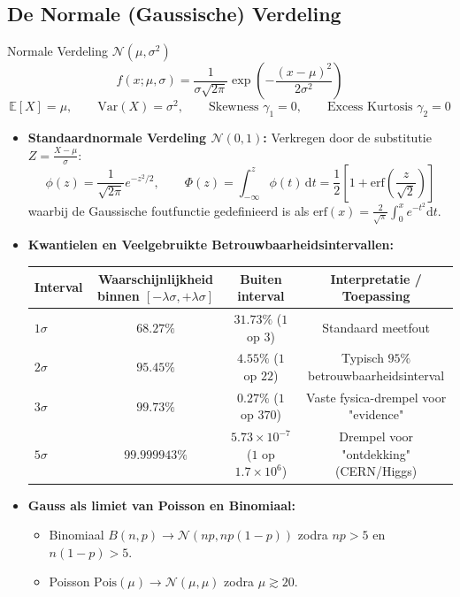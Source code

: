 \documentclass[11pt,a4paper]{article}
\newcommand{\E}{\mathbb{E}}
\newcommand{\Var}{\text{Var}}
\newcommand{\dd}{\mathrm{d}}
\newcommand{\normdist}{\mathcal{N}}
\begin{document}
\subsection{De Normale (Gaussische) Verdeling}
\begin{defbox}{Normale Verdeling $\normdist(\mu, \sigma^2)$}
\begin{equation}
    f(x; \mu, \sigma) = \frac{1}{\sigma \sqrt{2\pi}} \exp\left( -\frac{(x - \mu)^2}{2\sigma^2} \right)
\end{equation}
\begin{equation}
    \E[X] = \mu, \qquad \Var(X) = \sigma^2, \qquad \text{Skewness } \gamma_1 = 0, \qquad \text{Excess Kurtosis } \gamma_2 = 0
\end{equation}
\end{defbox}

\begin{itemize}[leftmargin=1.5em]
    \item \textbf{Standaardnormale Verdeling $\normdist(0, 1)$:}
    Verkregen door de substitutie $Z = \frac{X - \mu}{\sigma}$:
    \begin{equation}
        \phi(z) = \frac{1}{\sqrt{2\pi}} e^{-z^2/2}, \qquad \Phi(z) = \int_{-\infty}^z \phi(t) \, \dd t = \frac{1}{2} \left[ 1 + \text{erf}\left( \frac{z}{\sqrt{2}} \right) \right]
    \end{equation}
    waarbij de Gaussische foutfunctie gedefinieerd is als $\text{erf}(x) = \frac{2}{\sqrt{\pi}}\int_0^x e^{-t^2}\dd t$.
    \item \textbf{Kwantielen en Veelgebruikte Betrouwbaarheidsintervallen:}
    \begin{center}
        \small
        \begin{tabular}{lccc}
            \toprule
            Interval & Waarschijnlijkheid binnen $[-\lambda\sigma, +\lambda\sigma]$ & Buiten interval & Interpretatie / Toepassing \\
            \midrule
            $1\sigma$ & $68.27\%$ & $31.73\%$ ($1$ op $3$) & Standaard meetfout \\
            $2\sigma$ & $95.45\%$ & $4.55\%$ ($1$ op $22$) & Typisch $95\%$ betrouwbaarheidsinterval \\
            $3\sigma$ & $99.73\%$ & $0.27\%$ ($1$ op $370$) & Vaste fysica-drempel voor "evidence" \\
            $5\sigma$ & $99.999943\%$ & $5.73 \times 10^{-7}$ ($1$ op $1.7 \times 10^6$) & Drempel voor "ontdekking" (CERN/Higgs) \\
            \bottomrule
        \end{tabular}
    \end{center}
    \item \textbf{Gauss als limiet van Poisson en Binomiaal:}
    \begin{itemize}
        \item Binomiaal $B(n, p) \to \normdist(np, np(1 - p))$ zodra $np > 5$ en $n(1 - p) > 5$.
        \item Poisson $\text{Pois}(\mu) \to \normdist(\mu, \mu)$ zodra $\mu \gtrsim 20$.
    \end{itemize}
\end{itemize}
\end{document}
